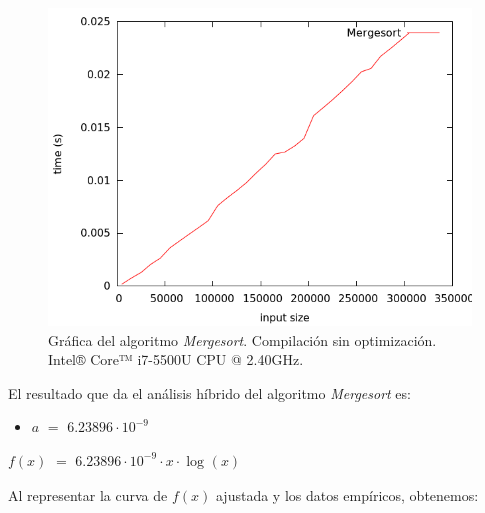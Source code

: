 \documentclass[11pt,a4paper]{article}
\begin{document}
				\begin{figure}[h]

					\centering
					\includegraphics[width=1\textwidth]{mergesort.png}
					\caption{Gráfica del algoritmo \textit{Mergesort}. Compilación sin optimización. Intel® Core™ i7-5500U CPU @ 2.40GHz.}

				\end{figure}

				\par
				El resultado que da el análisis híbrido del algoritmo \textit{Mergesort} es:

				\begin{itemize}

					\item
					$a$ $=$ $6.23896\cdot 10^{-9}$

				\end{itemize}

				\par
				$f(x)$ $=$ $ 6.23896\cdot 10^{-9}\cdot x \cdot \log_{}(x)$

\newpage

				\par
				Al representar la curva de $f(x)$ ajustada y los datos empíricos, obtenemos:
\end{document}
